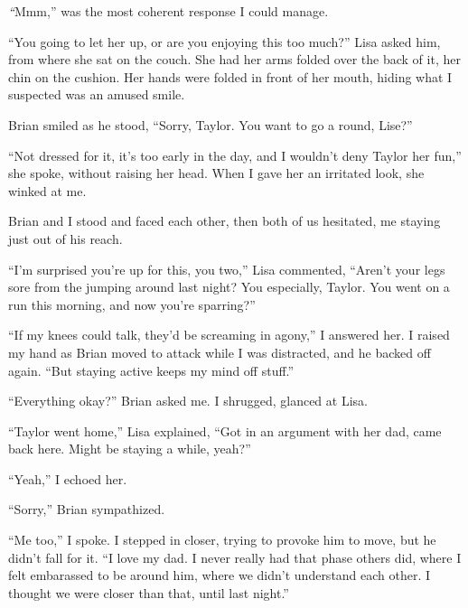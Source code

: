 \emph{``}Mmm,'' was the most coherent response I could manage.



``You going to let her up, or are you enjoying this too much?'' Lisa asked him, from where she sat on the couch.  She had her arms folded over the back of it, her chin on the cushion.  Her hands were folded in front of her mouth, hiding what I suspected was an amused smile.



Brian smiled as he stood, ``Sorry, Taylor.  You want to go a round, Lise?''



``Not dressed for it, it's too early in the day, and I wouldn't deny Taylor her fun,'' she spoke, without raising her head.  When I gave her an irritated look, she winked at me.



Brian and I stood and faced each other, then both of us hesitated, me staying just out of his reach.



``I'm surprised you're up for this, you two,'' Lisa commented, ``Aren't your legs sore from the jumping around last night?  You especially, Taylor.  You went on a run this morning, and now you're sparring?''



``If my knees could talk, they'd be screaming in agony,'' I answered her.  I raised my hand as Brian moved to attack while I was distracted, and he backed off again.  ``But staying active keeps my mind off stuff.''



``Everything okay?'' Brian asked me.  I shrugged, glanced at Lisa.



``Taylor went home,'' Lisa explained, ``Got in an argument with her dad, came back here.  Might be staying a while, yeah?''



``Yeah,'' I echoed her.



``Sorry,'' Brian sympathized.



``Me too,'' I spoke.  I stepped in closer, trying to provoke him to move, but he didn't fall for it.  ``I love my dad.  I never really had that phase others did, where I felt embarassed to be around him, where we didn't understand each other.  I thought we were closer than that, until last night.''



